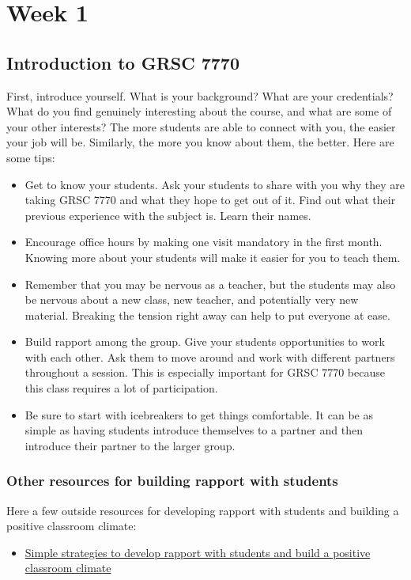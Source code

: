 \section{Week 1}
\label{sec:week-1}

\subsection{Introduction to GRSC 7770}
\label{sec:intr-grsc-7770}

First, introduce yourself. What is your background? What are your credentials? What do you find genuinely interesting about the course, and what are some of your other interests? The more students are able to connect with you, the easier your job will be. Similarly, the more you know about them, the better.  Here are some tips:

\begin{itemize}
\item Get to know your students. Ask your students to share with you why they are taking GRSC 7770 and what they hope to get out of it. Find out what their previous experience with the subject is. Learn their names. 
\item Encourage office hours by making one visit mandatory in the first month. Knowing more about your students will make it easier for you to teach them. 
\item Remember that you may be nervous as a teacher, but the students may also be nervous about a new class, new teacher, and potentially very new material. Breaking the tension right away can help to put everyone at ease.
\item Build rapport among the group.  Give your students opportunities to work with each other. Ask them to move around and work with different partners throughout a session.  This is especially important for GRSC 7770 because this class requires a lot of participation. 
\item Be sure to start with icebreakers to get things comfortable. It can be as simple as having students introduce themselves to a partner and then introduce their partner to the larger group.
\end{itemize}

\subsubsection{Other resources for building rapport with students}
\label{sec:other-reso-build}

Here a few outside resources for developing rapport with students and building a positive classroom climate:
\begin{itemize}
\item \href{https://github.com/WilliamOlsen/GRSC-2018/blob/master/Lectures/Week-1/BuildingRapport.pdf}{Simple strategies to develop rapport with students and build a positive classroom climate}
\end{itemize}




